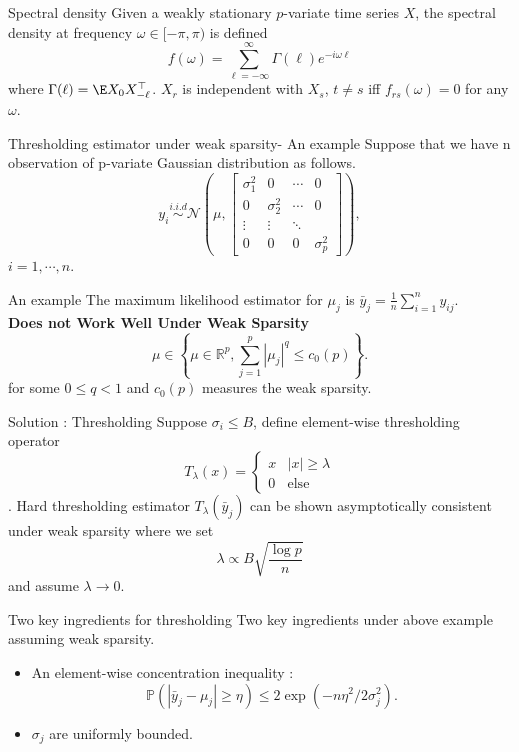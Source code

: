 \documentclass[handout,xcolor={usenames,dvipsnames}]{beamer}
\begin{document}
\begin{frame}{Spectral density}
Given a weakly stationary $p$-variate time series $X$,  the spectral density at frequency $\omega\in [-\pi,  \pi)$ is defined 
\[
f(\omega) = \sum_{\ell = -\infty} ^\infty \Gamma(\ell) e^{-i\omega \ell} 
\]
where $\Gamma(\ell) = \E X_0X_{-\ell}^\top$.   $X_r$ is independent with $X_s$, $t\neq s$ iff $f_{rs}(\omega) = 0$ for any $\omega$. 
\end{frame}

\begin{frame}{Thresholding estimator under weak sparsity- An example}
Suppose that we have n observation of p-variate Gaussian distribution as follows. 
\[
y_i \overset{i.i.d}{\sim} \mathcal{N}\left(\mu, 
\begin{bmatrix}
\sigma^2_1 & 0 & \cdots & 0\\  
0 & \sigma^2_2 & \cdots & 0\\
\vdots & \vdots & \ddots\\
0 & 0& 0& \sigma^2_p
\end{bmatrix}\right),
\]
$i=1,\cdots, n$. 
\end{frame}

\begin{frame}{An example}
The maximum likelihood estimator for $\mu_j$ is $\bar{y}_j = \frac{1}{n}\sum_{i=1}^n y_{ij}$.   \\ 
{\bf Does not Work Well Under Weak Sparsity} 
\[
\mu \in \left\{\mu \in \mathbb{R}^p, \sum_{j=1}^p |\mu_j|^q \le c_0(p)\right\}. 
\]
for some $0\le q<1$ and $c_0(p)$ measures the weak sparsity. 
\end{frame}


\begin{frame}{Solution : Thresholding}
Suppose $\sigma_i\le B$, define element-wise thresholding operator 
\[
T_\lambda(x) = \begin{cases}
x & |x|\ge  \lambda \\
0 & \text{else}
\end{cases} 
\]. 
Hard thresholding estimator $T_\lambda(\bar{y}_j)$ can be shown asymptotically consistent under weak sparsity where we set 
\[
\lambda \propto B   \sqrt{\frac{\log p}{n}}
\] 
and assume $\lambda\rightarrow 0$. 
\end{frame}

\begin{frame}{Two key ingredients for thresholding}
Two key ingredients under above example assuming weak sparsity. 
\begin{itemize}
\item An element-wise concentration inequality : 
\[
\mathbb{P}( |\bar{y}_j - \mu_j | \ge \eta) \le 2 \exp(-n\eta^2/2\sigma_j^2). 
\]
\item $\sigma_j$ are uniformly bounded.  
\end{itemize}
\end{frame}
\end{document}
